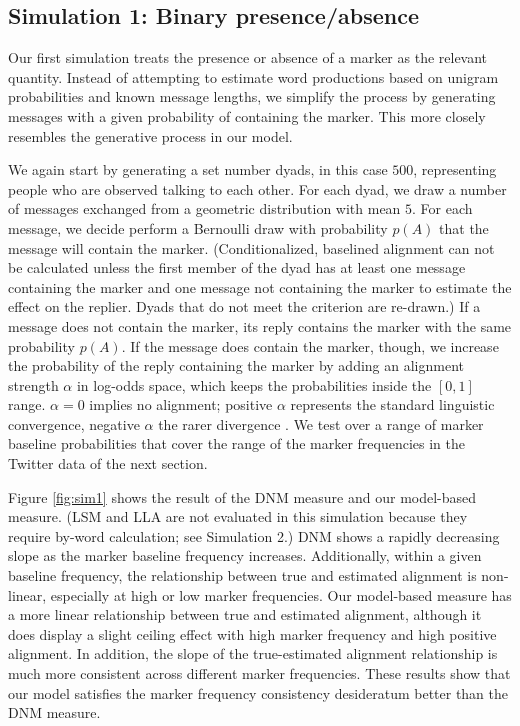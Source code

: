 \documentclass{acm_proc_article-sp}
\begin{document}
\subsection{Simulation 1: Binary presence/absence}
Our first simulation treats the presence or absence of a marker as the relevant quantity. Instead of attempting to estimate word productions based on unigram probabilities and known message lengths, we simplify the process by generating messages with a given probability of containing the marker.  This more closely resembles the generative process in our model.

We again start by generating a set number dyads, in this case $500$, representing people who are observed talking to each other. For each dyad, we draw a number of messages exchanged from a geometric distribution with mean $5$. For each message, we decide perform a Bernoulli draw with probability $p(A)$ that the message will contain the marker.  (Conditionalized, baselined alignment can not be calculated unless the first member of the dyad has at least one message containing the marker and one message not containing the marker to estimate the effect on the replier. Dyads that do not meet the criterion are re-drawn.) If a message does not contain the marker, its reply contains the marker with the same probability $p(A)$. If the message does contain the marker, though, we increase the probability of the reply containing the marker by adding an alignment strength $\alpha$ in log-odds space, which keeps the probabilities inside the $[0,1]$ range. $\alpha = 0$ implies no alignment; positive $\alpha$ represents the standard linguistic convergence, negative $\alpha$ the rarer divergence \cite{Ferrara1991}.  We test over a range of marker baseline probabilities that cover the range of the marker frequencies in the Twitter data of the next section. 

Figure \ref{fig:sim1} shows the result of the DNM measure and our model-based measure.  (LSM and LLA are not evaluated in this simulation because they require by-word calculation; see Simulation 2.) DNM shows a rapidly decreasing slope as the marker baseline frequency increases.  Additionally, within a given baseline frequency, the relationship between true and estimated alignment is non-linear, especially at high or low marker frequencies.  Our model-based measure has a more linear relationship between true and estimated alignment, although it does display a slight ceiling effect with high marker frequency and high positive alignment.  In addition, the slope of the true-estimated alignment relationship is much more consistent across different marker frequencies.  These results show that our model satisfies the marker frequency consistency desideratum better than the DNM measure.
\end{document}
